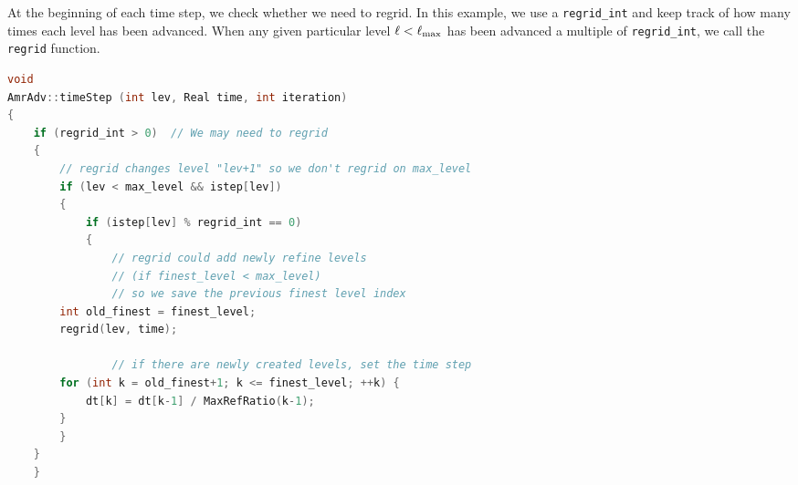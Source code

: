 At the beginning of each time step, we check whether we need to regrid.
In this example, we use a {\tt regrid\_int} and keep track of how many times each level
has been advanced.  When any given particular level $\ell<\ell_{\rm max}$ has been
advanced a multiple of {\tt regrid\_int}, we call the {\tt regrid} function.
\begin{lstlisting}[language=cpp]
void
AmrAdv::timeStep (int lev, Real time, int iteration)
{
    if (regrid_int > 0)  // We may need to regrid
    {
        // regrid changes level "lev+1" so we don't regrid on max_level
        if (lev < max_level && istep[lev])
        {
            if (istep[lev] % regrid_int == 0)
            {
                // regrid could add newly refine levels
                // (if finest_level < max_level)
                // so we save the previous finest level index
		int old_finest = finest_level; 
		regrid(lev, time);

                // if there are newly created levels, set the time step
		for (int k = old_finest+1; k <= finest_level; ++k) {
		    dt[k] = dt[k-1] / MaxRefRatio(k-1);
		}
	    }
	}
    }
\end{lstlisting}

